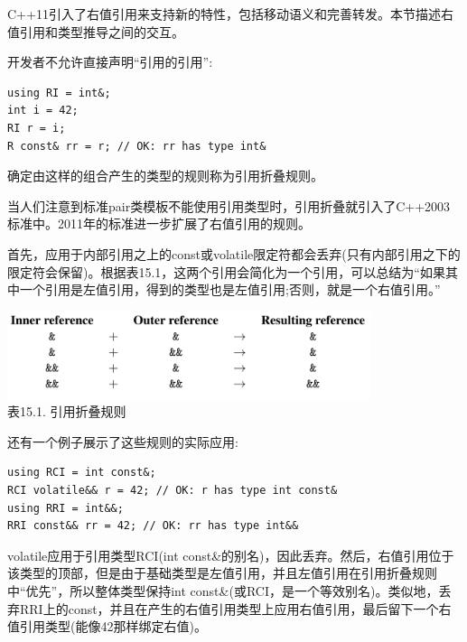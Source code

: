 
C++11引入了右值引用来支持新的特性，包括移动语义和完善转发。本节描述右值引用和类型推导之间的交互。


开发者不允许直接声明“引用的引用”:

\begin{lstlisting}[style=styleCXX]
using RI = int&;
int i = 42;
RI r = i;
R const& rr = r; // OK: rr has type int&
\end{lstlisting}

确定由这样的组合产生的类型的规则称为引用折叠规则。

\begin{tcolorbox}[colback=webgreen!5!white,colframe=webgreen!75!black]
\hspace*{0.75cm}当人们注意到标准pair类模板不能使用引用类型时，引用折叠就引入了C++2003标准中。2011年的标准进一步扩展了右值引用的规则。
\end{tcolorbox}

首先，应用于内部引用之上的const或volatile限定符都会丢弃(只有内部引用之下的限定符会保留)。根据表15.1，这两个引用会简化为一个引用，可以总结为“如果其中一个引用是左值引用，得到的类型也是左值引用;否则，就是一个右值引用。”

\begin{center}
\includegraphics[width=0.8\textwidth]{content/2/chapter15/images/1.png} \\
表15.1. 引用折叠规则
\end{center}

还有一个例子展示了这些规则的实际应用:

\begin{lstlisting}[style=styleCXX]
using RCI = int const&;
RCI volatile&& r = 42; // OK: r has type int const&
using RRI = int&&;
RRI const&& rr = 42; // OK: rr has type int&&
\end{lstlisting}

volatile应用于引用类型RCI(int const\&的别名)，因此丢弃。然后，右值引用位于该类型的顶部，但是由于基础类型是左值引用，并且左值引用在引用折叠规则中“优先”，所以整体类型保持int const\&(或RCI，是一个等效别名)。类似地，丢弃RRI上的const，并且在产生的右值引用类型上应用右值引用，最后留下一个右值引用类型(能像42那样绑定右值)。

